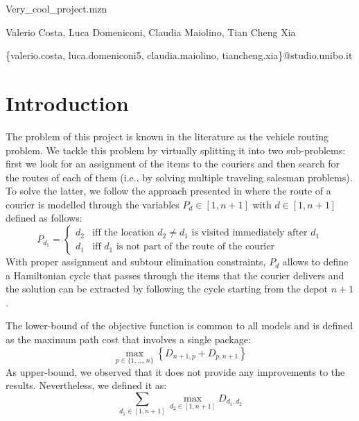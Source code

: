 \documentclass{article}
\begin{document}
    \begin{titlepage}
        \begin{center}
            {\LARGE Very\_cool\_project.mzn}
            \vspace*{1em}
            
            Valerio Costa, Luca Domeniconi, Claudia Maiolino, Tian Cheng Xia

            \centerline{\{valerio.costa, luca.domeniconi5, claudia.maiolino, tiancheng.xia\}@studio.unibo.it}
        \end{center}
    \end{titlepage}


    \section{Introduction} \label{sec:intro}
    The problem of this project is known in the literature as the vehicle routing problem. We tackle this problem by virtually splitting it into two sub-problems: first we look for an assignment of the items to the couriers and then search for the routes of each of them (i.e., by solving multiple traveling salesman problems). To solve the latter, we follow the approach presented in \cite{vrp} where the route of a courier is modelled through the variables $P_d \in [1, n+1]$ with $d \in [1, n+1]$ defined as follows:
    \begin{equation}
        \label{eq:path_def}
        P_{d_1} = \begin{cases}
            d_2 & \text{iff the location $d_2 \neq d_1$ is visited immediately after $d_1$}\\
            d_1 & \text{iff $d_1$ is not part of the route of the courier}
        \end{cases}
    \end{equation} 
    With proper assignment and subtour elimination constraints, $P_d$ allows to define a Hamiltonian cycle that passes through the items that the courier delivers and the solution can be extracted by following the cycle starting from the depot $n+1$.

    The lower-bound of the objective function is common to all models and is defined as the maximum path cost that involves a single package:
    \begin{equation}
        \max_{p \in \{ 1, \dots, n \}} \left\{ D_{n+1, p} + D_{p, n+1} \right\}
    \end{equation}
    As upper-bound, we observed that it does not provide any improvements to the results. Nevertheless, we defined it as:
    \begin{equation}
        \sum_{d_1 \in [1, n+1]} \max_{d_2 \in [1, n+1]} D_{d_1, d_2}
    \end{equation}
\end{document}
